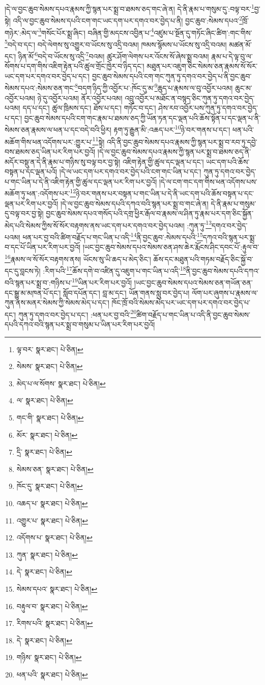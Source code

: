 །དེ་ལ་བྱང་ཆུབ་སེམས་དཔའ་རྣམས་ཀྱི་སྙན་པར་སྨྲ་བ་ཐམས་ཅད་གང་ཞེ་ན། དེ་ནི་རྣམ་པ་གསུམ་དུ་:བལྟ་བར་\footnote{ལྟ་བར་  སྣར་ཐང་།  པེ་ཅིན། }བྱ་སྟེ། འདི་ལ་བྱང་ཆུབ་སེམས་དཔའི་ངག་གང་ཡང་དག་པར་དགའ་བར་བྱེད་པ་ནི། བྱང་ཆུབ་:སེམས་དཔའ་\footnote{སེམས་  སྣར་ཐང་།  པེ་ཅིན། }ཁྲོ་གཉེར་:མེད་ལ་\footnote{མེད་པ་ལ་སོགས་  སྣར་ཐང་།  པེ་ཅིན། }གསོང་པོར་སྨྲ་ཞིང་། བཞིན་གྱི་མདངས་འབྱིན་པ་\footnote{ལ་  སྣར་ཐང་།  པེ་ཅིན། }འཛུམ་པ་སྔོན་དུ་གཏོང་ཞིང་ཚིག་:གང་གིས་\footnote{གང་གི་  སྣར་ཐང་།  པེ་ཅིན། }བདེ་བ་དང་། བདེ་ལེགས་སུ་འགྱུར་བ་ཡོངས་སུ་འདྲི་བའམ། ཁམས་སྙོམས་པ་ཡོངས་སུ་འདྲི་བའམ། མཚན་མོ་དང་། ཉིན་མོ་\footnote{མོར་  སྣར་ཐང་།  པེ་ཅིན། }བདེ་བ་ཡོངས་སུ་འདྲི་\footnote{དྲི་  སྣར་ཐང་།  པེ་ཅིན། }བའམ། ཚུར་ཤོག་ལེགས་པར་འོངས་སོ་ཞེས་སྨྲ་བའམ། རྣམ་པ་དེ་ལྟ་བུ་ལ་སོགས་པ་དག་གིས་འཇིག་རྟེན་པའི་ཚུལ་གྲོང་ཁྱེར་བ་ཉིད་དང་། མཐུན་པར་འཇུག་ཅིང་སེམས་ཅན་རྣམས་སོ་སོར་ཡང་དག་པར་དགའ་བར་བྱེད་པ་དང་། བྱང་ཆུབ་སེམས་དཔའི་ངག་གང་ཀུན་ཏུ་དགའ་བར་བྱེད་པ་ནི་བྱང་ཆུབ་སེམས་དཔའ་:སེམས་ཅན་གང་\footnote{སེམས་ཅན་  སྣར་ཐང་།  པེ་ཅིན། }བདག་ཉིད་ཀྱི་འབྱོར་པ་:ཁོང་དུ་མ་\footnote{ཁོང་དུ་  སྣར་ཐང་།  པེ་ཅིན། }ཆུད་པ་རྣམས་ལ་བུ་འབྱོར་པའམ། ཆུང་མ་འབྱོར་པའམ། ཉེ་དུ་འབྱོར་པའམ། ནོར་འབྱོར་པའམ། འབྲུ་འབྱོར་པ་མཐོང་ན་བསྙད་ཅིང་ཀུན་ཏུ་དགའ་བར་བྱེད་པའམ། དད་པ་དང་། ཚུལ་ཁྲིམས་དང་། ཐོས་པ་དང་། གཏོང་བ་དང་། ཤེས་རབ་འབྱོར་པས་ཀུན་ཏུ་དགའ་བར་བྱེད་པ་དང་། བྱང་ཆུབ་སེམས་དཔའི་ངག་གང་རྣམ་པ་ཐམས་ཅད་ཀྱི་ཡོན་ཏན་དང་ལྡན་པའི་ཆོས་སྟོན་པ་དང་ལྡན་པ་ནི་སེམས་ཅན་རྣམས་ལ་ཕན་པ་དང་བདེ་བའི་ཕྱིར། རྟག་ཏུ་རྒྱུན་མི་:འཆད་པར་\footnote{འཆད་པ་  སྣར་ཐང་།  པེ་ཅིན། }ཉེ་བར་གནས་པ་དང་། ཕན་པའི་མཆོག་གིས་ཕན་འདོགས་པར་:གྱུར་པ་\footnote{འགྱུར་པ་  སྣར་ཐང་།  པེ་ཅིན། }སྟེ། འདི་ནི་བྱང་ཆུབ་སེམས་དཔའ་རྣམས་ཀྱི་སྙན་པར་སྨྲ་བ་རབ་ཏུ་དབྱེ་བས་ཐམས་ཅད་ཡིན་པར་རིག་པར་བྱའོ། །དེ་ལ་བྱང་ཆུབ་སེམས་དཔའ་རྣམས་ཀྱི་སྙན་པར་སྨྲ་བ་ཐམས་ཅད་ནི་མདོར་བསྡུ་ན་དེ་ནི་རྣམ་པ་གཉིས་སུ་བལྟ་བར་བྱ་སྟེ། འཇིག་རྟེན་གྱི་ཚུལ་དང་ལྡན་པ་དང་། ཡང་དག་པའི་ཆོས་བསྟན་པ་དང་ལྡན་པའོ། །དེ་ལ་ཡང་དག་པར་དགའ་བར་བྱེད་པའི་ངག་གང་ཡིན་པ་དང་། ཀུན་ཏུ་དགའ་བར་བྱེད་པ་གང་ཡིན་པ་དེ་ནི་འཇིག་རྟེན་གྱི་ཚུལ་དང་ལྡན་པར་རིག་པར་བྱའོ། །དེ་ལ་ངག་གང་དག་གིས་ཕན་འདོགས་པས་མཆོག་ཏུ་ཕན་:འདོགས་པར་\footnote{འདོགས་པ་  སྣར་ཐང་།  པེ་ཅིན། }ཉེ་བར་གནས་པར་བསྟན་པ་གང་ཡིན་པ་དེ་ནི་ཡང་དག་པའི་ཆོས་བསྟན་པ་དང་ལྡན་པར་རིག་པར་བྱའོ། །དེ་ལ་བྱང་ཆུབ་སེམས་དཔའི་དཀའ་བའི་སྙན་པར་སྨྲ་བ་གང་ཞེ་ན། དེ་ནི་རྣམ་པ་གསུམ་དུ་བལྟ་བར་བྱ་སྟེ། བྱང་ཆུབ་སེམས་དཔའ་གསོད་པའི་དགྲ་ཕྱིར་རྒོལ་བ་རྣམས་ལ་ཤིན་ཏུ་རྣམ་པར་དག་ཅིང་སྐྱོན་མེད་པའི་སེམས་ཀྱིས་སོ་སོར་བརྟགས་ནས་ཡང་དག་པར་དགའ་བར་བྱེད་པའམ། :ཀུན་ཏུ་\footnote{ཀུན་  སྣར་ཐང་།  པེ་ཅིན། }དགའ་བར་བྱེད་པའམ། ཕན་པར་བྱ་བའི་ཚིག་བརྗོད་པ་གང་ཡིན་པ་འདི་\footnote{དེ་  སྣར་ཐང་།  པེ་ཅིན། }ནི་བྱང་ཆུབ་:སེམས་དཔའི་\footnote{སེམས་དཔའ་  སྣར་ཐང་།  པེ་ཅིན། }དཀའ་བའི་སྙན་པར་སྨྲ་བ་དང་པོ་ཡིན་པར་རིག་པར་བྱའོ། །ཡང་བྱང་ཆུབ་སེམས་དཔའ་སེམས་ཅན་ཤས་ཆེར་རྨོངས་ཤིང་དབང་པོ་:རྟུལ་བ་\footnote{བརྟུལ་བ་  སྣར་ཐང་།  པེ་ཅིན། }རྣམས་ལ་སོ་སོར་བརྟགས་ནས། ཡོངས་སུ་ཡི་ཆད་པ་མེད་ཅིང་། ཆོས་དང་མཐུན་པའི་གཏམ་བརྗོད་ཅིང་སྐྱོ་བ་དང་དུ་བླངས་ཏེ། :རིག་པའི་\footnote{རིགས་པའི་  སྣར་ཐང་།  པེ་ཅིན། }ཆོས་དགེ་བ་འཛིན་དུ་འཇུག་པ་གང་ཡིན་པ་འདི་\footnote{དེ་  སྣར་ཐང་།  པེ་ཅིན། }ནི་བྱང་ཆུབ་སེམས་དཔའི་དཀའ་བའི་སྙན་པར་སྨྲ་བ་:གཉིས་པ་\footnote{གཉིས་  སྣར་ཐང་།  པེ་ཅིན། }ཡིན་པར་རིག་པར་བྱའོ། །ཡང་བྱང་ཆུབ་སེམས་དཔའ་སེམས་ཅན་གཡོན་ཅན་དང་སྒྱུ་མ་མཁན་པོ་དང་། སློབ་དཔོན་དང་། བླ་མ་དང་། ཡོན་གནས་སླུ་བར་བྱེད་པ། ལོག་པར་ཞུགས་པ་རྣམས་ལ་ཀུན་ནས་མནར་སེམས་ཀྱི་སེམས་མེད་པ་དང་། ཁོང་ཁྲོ་བའི་སེམས་མེད་པར་ཡང་དག་པར་དགའ་བར་བྱེད་པ་དང་། ཀུན་ཏུ་དགའ་བར་བྱེད་པ་དང་། :ཕན་པར་བྱ་བའི་\footnote{ཕན་པའི་  སྣར་ཐང་།  པེ་ཅིན། }ཚིག་བརྗོད་པ་གང་ཡིན་པ་འདི་ནི་བྱང་ཆུབ་སེམས་དཔའི་དཀའ་བའི་སྙན་པར་སྨྲ་བ་གསུམ་པ་ཡིན་པར་རིག་པར་བྱའོ། 